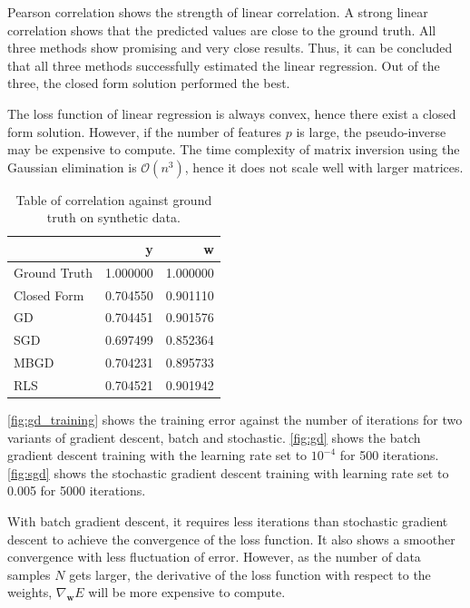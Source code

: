\documentclass{article}
\begin{document}
Pearson correlation shows the strength of linear correlation. A strong linear correlation shows that the predicted values are close to the ground truth. All three methods show promising and very close results. Thus, it can be concluded that all three methods successfully estimated the linear regression. Out of the three, the closed form solution performed the best.

The loss function of linear regression is always convex, hence there exist a closed form solution. However, if the number of features $p$ is large, the pseudo-inverse may be expensive to compute. The time complexity of matrix inversion using the Gaussian elimination is $\mathcal{O}(n^3)$, hence it does not scale well with larger matrices.

\begin{table}[h!]
    \centering
    \caption{Table of correlation against ground truth on synthetic data.}
    \label{tab:task1_corr}
    \begin{tabular}{lrr}
    \toprule
    {} &         y &         w \\
    \midrule
    Ground Truth &  1.000000 &  1.000000 \\
    Closed Form  &  0.704550 &  0.901110 \\
    GD           &  0.704451 &  0.901576 \\
    SGD          &  0.697499 &  0.852364 \\
    MBGD         &  0.704231 &  0.895733 \\
    RLS          &  0.704521 &  0.901942 \\
    \bottomrule
    \end{tabular}
    
\end{table}
    
    
    

\cref{fig:gd_training} shows the training error against the number of iterations for two variants of gradient descent, batch and stochastic. \cref{fig:gd} shows the batch gradient descent training with the learning rate set to $10^{-4}$ for 500 iterations. \cref{fig:sgd} shows the stochastic gradient descent training with learning rate set to 0.005 for 5000 iterations.

With batch gradient descent, it requires less iterations than stochastic gradient descent to achieve the convergence of the loss function. It also shows a smoother convergence with less fluctuation of error. However, as the number of data samples $N$ gets larger, the derivative of the loss function with respect to the weights, $\nabla_{\boldsymbol{w}} E$ will be more expensive to compute.
\end{document}

